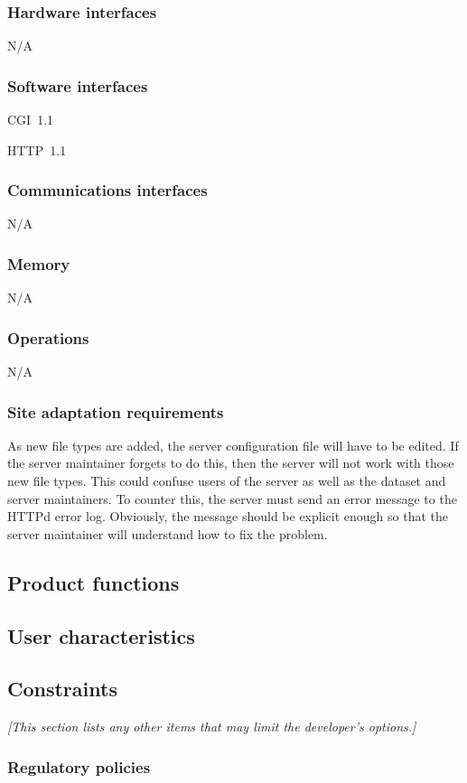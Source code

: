 \documentclass{article}
\newcommand{\na}{{\sc N/A}\xspace}
\begin{document}
\subsubsection{Hardware interfaces}
\na
\subsubsection{Software interfaces}
CGI~1.1

HTTP~1.1

\subsubsection{Communications interfaces}
\na
\subsubsection{Memory}
\na
\subsubsection{Operations}
\na
\subsubsection{Site adaptation requirements}
As new file types are added, the server configuration file will have
to be edited. If the server maintainer forgets to do this, then the
server will not work with those new file types. This could confuse
users of the server as well as the dataset and server maintainers. To
counter this, the server must send an error message to the HTTPd error
log. Obviously, the message should be explicit enough so that the server
maintainer will understand how to fix the problem.

\subsection{Product functions}

\subsection{User characteristics}

\subsection{Constraints}
\emph{[This section lists any other items that may limit the developer's
  options.]}

\subsubsection{Regulatory policies}
\end{document}
